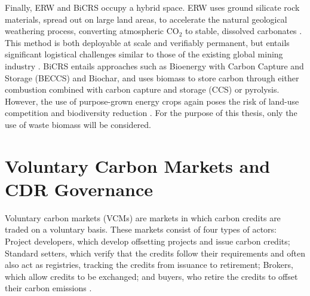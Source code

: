 Finally, ERW and BiCRS occupy a hybrid space. ERW uses ground silicate rock materials, spread out on large land areas, to accelerate the natural geological weathering process, converting atmospheric CO$_2$ to stable, dissolved carbonates \parencite{larkin_carbon_2023}. This method is both deployable at scale and verifiably permanent, but entails significant logistical challenges similar to those of the existing global mining industry \parencite{madankan_larger_2025}. BiCRS entails approaches such as Bioenergy with Carbon Capture and Storage (BECCS) and Biochar, and uses biomass to store carbon through either combustion combined with carbon capture and storage (CCS) or pyrolysis. However, the use of purpose-grown energy crops again poses the risk of land-use competition and biodiversity reduction \parencite{gaucher_leveraging_2025}. For the purpose of this thesis, only the use of waste biomass will be considered.
\begin{table}[]
\caption{Classification and characteristics of selected NETs}
\end{table}

\section{Voluntary Carbon Markets and CDR Governance}
Voluntary carbon markets (VCMs) are markets in which carbon credits are traded on a voluntary basis. These markets consist of four types of actors: Project developers, which develop offsetting projects and issue carbon credits; Standard setters, which verify that the credits follow their requirements and often also act as registries, tracking the credits from issuance to retirement; Brokers, which allow credits to be exchanged; and buyers, who retire the credits to offset their carbon emissions \parencite{favasuli_voluntary_2025}.\vspace{2mm}

